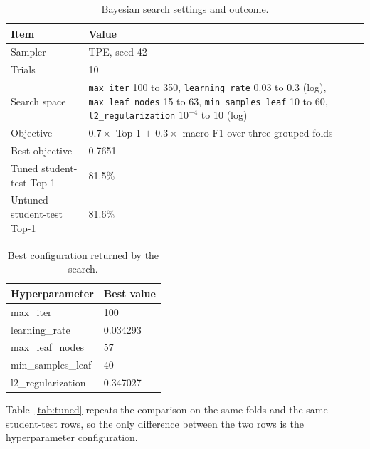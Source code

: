 \documentclass[11pt,a4paper]{article}
\begin{document}
\begin{table}[H]
\centering
\caption{Bayesian search settings and outcome.}
\label{tab:tuning}
\begin{tabular}{@{}p{}p{}@{}}
\toprule
\textbf{Item} & \textbf{Value} \\
\midrule
Sampler & TPE, seed 42 \\
Trials & 10 \\
Search space & \texttt{max\_iter} 100 to 350, \texttt{learning\_rate} 0.03 to 0.3 (log),
\texttt{max\_leaf\_nodes} 15 to 63, \texttt{min\_samples\_leaf} 10 to 60,
\texttt{l2\_regularization} \(10^{-4}\) to 10 (log) \\
Objective & \(0.7 \times\) Top-1 \(+\) \(0.3 \times\) macro F1 over three grouped folds \\
Best objective & 0.7651 \\
Tuned student-test Top-1 & 81.5\% \\
Untuned student-test Top-1 & 81.6\% \\
\bottomrule
\end{tabular}
\end{table}

\begin{table}[H]
\centering
\caption{Best configuration returned by the search.}
\label{tab:bestparams}
\begin{tabular}{@{}ll@{}}
\toprule
\textbf{Hyperparameter} & \textbf{Best value} \\
\midrule
max\_iter & 100 \\
learning\_rate & 0.034293 \\
max\_leaf\_nodes & 57 \\
min\_samples\_leaf & 40 \\
l2\_regularization & 0.347027 \\
\bottomrule
\end{tabular}
\end{table}

Table~\ref{tab:tuned} repeats the comparison on the same folds and the same student-test rows, so the
only difference between the two rows is the hyperparameter configuration.

\begin{table}[H]
\centering
\caption{Tuned against untuned model on identical folds and identical student-test rows. Inference time
is the fastest of three prediction passes over the student-test candidates.}
\label{tab:tuned}
\small
{}
\end{table}
\end{document}
